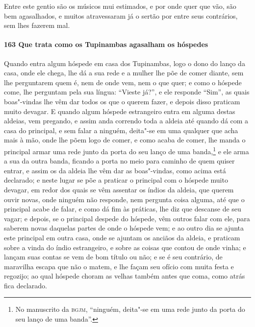 \begin{linenumbers}
Entre este gentio são os músicos mui estimados, e por onde quer que vão, são bem
agasalhados, e muitos atravessaram já o sertão por entre seus contrários, sem lhes fazerem
mal.

\paragraph{163 Que trata como os Tupinambas agasalham os hóspedes}\quad
Quando entra algum hóspede em casa dos Tupinambas, logo o dono do lanço da casa, onde ele
chega, lhe dá a sua rede e a mulher lhe põe de comer diante, sem lhe perguntarem quem é,
nem de onde vem, nem o que quer; e como o hóspede come, lhe perguntam pela sua língua:
``Vieste já?'', e ele responde ``Sim'', as quais boas"-vindas lhe vêm dar todos os que o
querem fazer, e depois disso praticam muito devagar. E quando algum hóspede estrangeiro
entra em alguma destas aldeias, vem pregando, e assim anda correndo toda a aldeia até
quando dá com a casa do principal, e sem falar a ninguém, deita"-se em uma qualquer que
acha mais à mão, onde lhe põem logo de comer, e como acaba de comer, lhe manda o principal
armar uma rede junto da porta do seu lanço de uma banda,\footnote{ No manuscrito da
\textsc{bgjm}, ``ninguém, deita"-se em uma rede junto da porta do seu lanço de uma
banda''.} e ele arma a sua da outra banda, ficando a porta no meio para caminho de quem
quiser entrar, e assim os da aldeia lhe vêm dar as boas"-vindas, como acima está declarado;
e neste lugar se põe a praticar o principal com o hóspede muito devagar, em redor dos
quais se vêm assentar os índios da aldeia, que querem ouvir novas, onde ninguém não
responde, nem pergunta coisa alguma, até que o principal acabe de falar, e como dá fim às
práticas, lhe diz que descanse de seu vagar; e depois, se o principal despede do hóspede,
vêm outros falar com ele, para saberem novas daquelas partes de onde o hóspede vem; e ao
outro dia se ajunta este principal em outra casa, onde se ajuntam os anciãos da aldeia, e
praticam sobre a vinda do índio estrangeiro, e sobre as coisas que contou de onde vinha; e
lançam suas contas se vem de bom título ou não; e se é seu contrário, de maravilha escapa
que não o matem, e lhe façam seu ofício com muita festa e regozijo; ao qual hóspede choram
as velhas também antes que coma, como atrás fica declarado.


\end{linenumbers}
